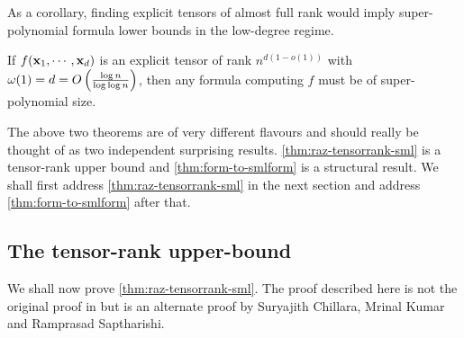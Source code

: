 As a corollary, finding explicit tensors of almost full rank would imply super-polynomial formula lower bounds in the low-degree regime.

\begin{corollary}
  If $f(\mathbf{x}_1,\cdots, \mathbf{x}_d)$ is an explicit tensor of rank $n^{d(1- o(1))}$ with $\omega(1) = d = O\left(\frac{\log n}{\log\log n}\right)$, then any formula computing $f$ must be of super-polynomial size.
\end{corollary}

The above two theorems are of very different flavours and should really be thought of as two independent surprising results.
\autoref{thm:raz-tensorrank-sml} is a tensor-rank upper bound and \autoref{thm:form-to-smlform} is a structural result.
We shall first address \autoref{thm:raz-tensorrank-sml} in the next section and address \autoref{thm:form-to-smlform} after that.

\subsection{The tensor-rank upper-bound}

We shall now prove \autoref{thm:raz-tensorrank-sml}. The proof described here is not the original proof in \cite{raz10} but is an alternate proof by Suryajith Chillara, Mrinal Kumar and Ramprasad Saptharishi. 

